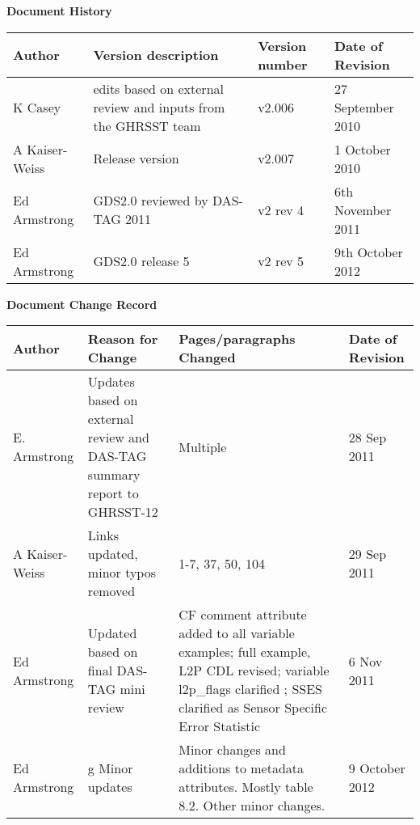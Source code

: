 \newpage

\textbf{\large Document History} 
\par \vspace{1.5cm}
\begin{tabular}{|p{2.5cm}|>{\raggedright}p{5.5cm}|p{3cm}|p{2cm}|}
    \hline \rowcolor{lightgray}
        Author & Version description & Version number & Date of Revision\\
    \hline
        K Casey & edits based on external review and inputs from the GHRSST team & v2.006 & 27 September 2010 \\
    \hline
        A Kaiser-Weiss & Release version & v2.007 & 1 October 2010 \\
    \hline
        Ed Armstrong & GDS2.0 reviewed by DAS-TAG 2011 & v2 rev 4 & 6th November 2011 \\
    \hline
        Ed Armstrong & GDS2.0 release 5 & v2 rev 5 & 9th October 2012 \\
    \hline
\end{tabular}

\par \vspace{3cm}
\textbf{\Large Document Change Record} \par \vspace{1.5cm}
\begin{tabular}{|p{2.5cm}|>{\raggedright}p{5.5cm}|p{3.5cm}|p{2cm}|}
    \hline \rowcolor{lightgray}
        Author & Reason for Change & Pages/paragraphs Changed & Date of Revision\\
    \hline
        E. Armstrong & Updates based on external review and DAS-TAG summary report to GHRSST-12 & Multiple & 28 Sep 2011 \\
    \hline
        A Kaiser-Weiss & Links updated, minor typos removed & 1-7, 37, 50, 104 & 29 Sep 2011 \\
    \hline
        Ed Armstrong & Updated based on final DAS-TAG mini review & CF comment attribute added to all variable examples; full example, L2P CDL revised; variable l2p\_flags clarified ; SSES clarified as Sensor Specific Error Statistic & 6 Nov 2011 \\
    \hline
        Ed Armstrong & g Minor updates & Minor changes and additions to metadata attributes. Mostly table 8.2. Other minor changes. & 9 October 2012 \\
    \hline
\end{tabular}